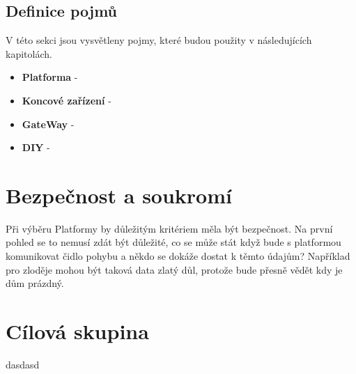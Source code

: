 \documentclass[thesis=B,czech]{FITthesis}[2019/12/23]
\begin{document}
\subsection{Definice pojmů}
V této sekci jsou vysvětleny pojmy, které budou použity v následujících kapitolách.
    
\begin{itemize}
    \item \textbf{Platforma} -
    \item \textbf{Koncové zařízení} -
    \item \textbf{GateWay} -
    \item \textbf{DIY} -
\end{itemize}

\section{Bezpečnost a soukromí}
Při výběru Platformy by důležitým kritériem měla být bezpečnost. Na první pohled se to nemusí zdát být důležité, co se může stát když bude s platformou komunikovat čidlo pohybu a někdo se dokáže dostat k těmto údajům? Například pro zloděje mohou být taková data zlatý důl, protože bude přesně vědět kdy je dům prázdný.
 
\section{Cílová skupina}
    dasdasd
\end{document}

